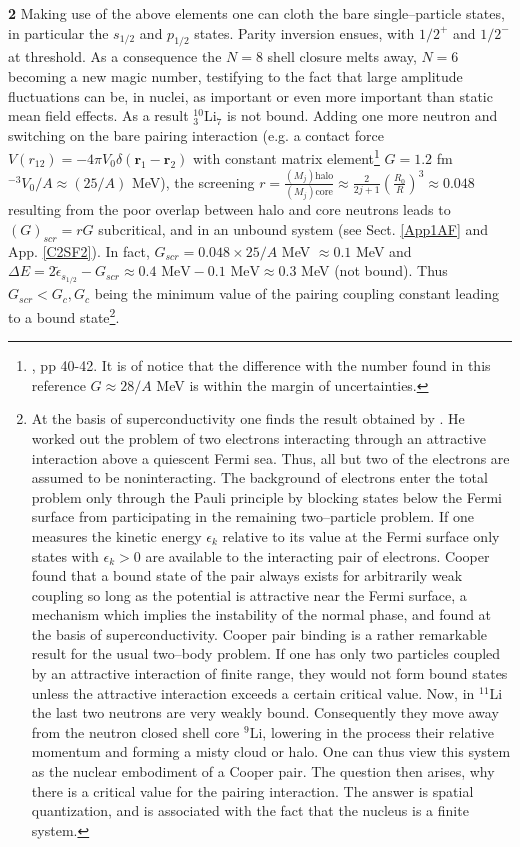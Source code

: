 \textbf{2} Making use of the above elements one can cloth the bare single--particle states, in particular the $s_{1/2}$ and $p_{1/2}$ states. Parity inversion ensues, with $1/2^+$ and $1/2^-$ at threshold. As a consequence the $N=8$ shell closure melts away, $N=6$ becoming a new magic number, testifying to the fact that  large amplitude fluctuations can be, in nuclei, as important or even more important than static mean field effects. As a result $^{10}_3$Li$_7$ is not bound. Adding one more neutron and switching on the bare pairing interaction (e.g. a contact force $V(r_{12})=-4\pi V_0\delta(\mathbf r_1-\mathbf r_2)$ with constant matrix element\footnote{\cite{Brink:05}, pp 40-42. It is of notice that the difference with the number found in this reference $G\approx28/A$ MeV is within the margin of uncertainties.} $G=1.2$ fm$^{-3}V_0/A\approx (25/A)$ MeV), the screening  $r=\frac{(M_j)\text{halo}}{(M_j)\text{core}}\approx \frac{2}{2j+1}\left(\frac{R_0}{R}\right)^3\approx 0.048$ resulting from the poor overlap between halo and core neutrons leads to  $(G)_{scr}=rG$ subcritical, and in an unbound system (see Sect. \ref{App1AF} and App. \ref{C2SF2}). In fact, $G_{scr}=0.048\times25/A$ MeV $\approx0.1$ MeV and $\Delta E=2\tilde\epsilon_{s_{1/2}}-G_{scr}\approx0.4\text{ MeV}-0.1\text{ MeV}\approx 0.3$ MeV (not bound). Thus $G_{scr}<G_c, G_c$ being the minimum value of the pairing coupling constant leading to a bound state\footnote{At the basis of superconductivity one finds the result obtained by \cite{Cooper:56}. He worked out the problem of two electrons interacting through an attractive interaction above a quiescent Fermi sea. Thus, all but two of the electrons are assumed to be noninteracting. The background of electrons enter the total problem only through the Pauli principle by blocking states below the Fermi surface from participating in the remaining two--particle problem. If one measures the kinetic energy $\epsilon_k$ relative to its value at the Fermi surface only states with $\epsilon_k>0$ are available to the interacting pair of electrons. Cooper found that a bound state of the pair always exists for arbitrarily weak coupling so long as the potential is attractive near the Fermi surface, a mechanism which implies the instability of the normal phase, and found at the basis of superconductivity. Cooper pair binding is a rather remarkable result for the usual two--body problem. If one has only two particles coupled by an attractive interaction of finite range, they would not form bound states unless the attractive interaction exceeds a certain critical value. Now, in $^{11}$Li the last two neutrons are very weakly bound. Consequently they move away from the neutron closed shell core $^9$Li, lowering in the process their relative momentum and forming a misty cloud or halo. One can thus view this system as the nuclear embodiment of a Cooper pair. The question then arises, why there is a critical value for the pairing interaction. The answer is spatial quantization, and is associated with the fact that the nucleus is a finite system.}.

